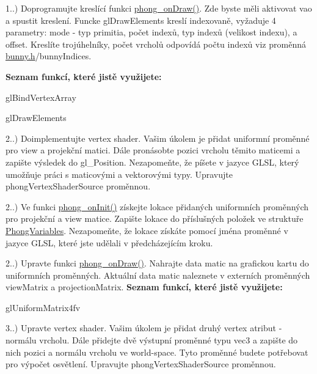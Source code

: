 \begin{DoxyRefList}
1..) Doprogramujte kreslící funkci \hyperlink{student_8h_a53ffbb1a271d285abdaf7a029192f47e}{phong\-\_\-on\-Draw()}. Zde byste měli aktivovat vao a spustit kreslení. Funcke gl\-Draw\-Elements kreslí indexovaně, vyžaduje 4 parametry\-: mode -\/ typ primitia, počet indexů, typ indexů (velikost indexu), a offset. Kreslíte trojúhelníky, počet vrcholů odpovídá počtu indexů viz proměnná \hyperlink{bunny_8h}{bunny.\-h}/bunny\-Indices.\par
 {\bfseries Seznam funkcí, které jistě využijete\-:}
\begin{DoxyItemize}
\item gl\-Bind\-Vertex\-Array
\item gl\-Draw\-Elements  
\end{DoxyItemize}
\item[\label{todo__todo000001}%
\hypertarget{todo__todo000001}{}%
Group \hyperlink{group__task2}{task2} ]2..) Doimplementujte vertex shader. Vašim úkolem je přidat uniformní proměnné pro view a projekční matici. Dále pronásobte pozici vrcholu těmito maticemi a zapište výsledek do gl\-\_\-\-Position. Nezapomeňte, že píšete v jazyce G\-L\-S\-L, který umožňuje práci s maticovými a vektorovými typy. Upravujte phong\-Vertex\-Shader\-Source proměnnou. 

2..) Ve funkci \hyperlink{student_8h_ac2adb2ba4e748239b9db4d037584d3cc}{phong\-\_\-on\-Init()} získejte lokace přidaných uniformních proměnných pro projekční a view matice. Zapište lokace do příslušných položek ve struktuře \hyperlink{structPhongVariables}{Phong\-Variables}. Nezapomeňte, že lokace získáte pomocí jména proměnné v jazyce G\-L\-S\-L, které jste udělali v předcházejícím kroku. 

2..) Upravte funkci \hyperlink{student_8h_a53ffbb1a271d285abdaf7a029192f47e}{phong\-\_\-on\-Draw()}. Nahrajte data matic na grafickou kartu do uniformních proměnných. Aktuální data matic naleznete v externích proměnných view\-Matrix a projection\-Matrix. {\bfseries Seznam funkcí, které jistě využijete\-:}
\begin{DoxyItemize}
\item gl\-Uniform\-Matrix4fv  
\end{DoxyItemize}
\item[\label{todo__todo000002}%
\hypertarget{todo__todo000002}{}%
Group \hyperlink{group__task3}{task3} ]3..) Upravte vertex shader. Vašim úkolem je přidat druhý vertex atribut -\/ normálu vrcholu. Dále přidejte dvě výstupní proměnné typu vec3 a zapište do nich pozici a normálu vrcholu ve world-\/space. Tyto proměnné budete potřebovat pro výpočet osvětlení. Upravujte phong\-Vertex\-Shader\-Source proměnnou. 


\end{DoxyRefList}
